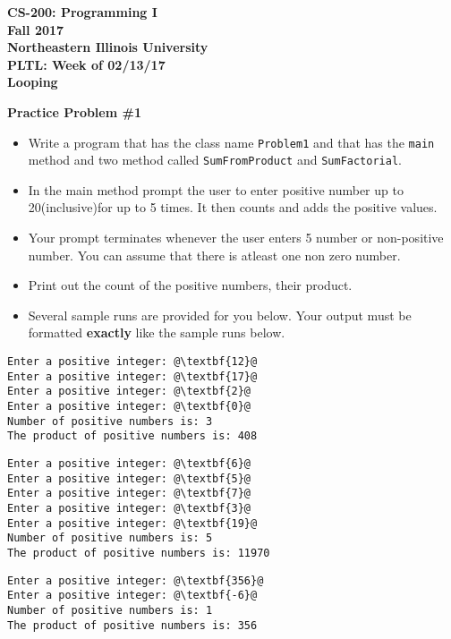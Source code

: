 \documentclass[12pt]{article}
\begin{document}
\begin{center}
	\textbf{CS-200: Programming I}\\
	\textbf{Fall 2017}\\
	\textbf{Northeastern Illinois University}\\
	\textbf{PLTL: Week of 02/13/17}\\
	\textbf{Looping}
\end{center}


\noindent\textbf{Practice Problem \#1}
\begin{itemize}
	\item Write a program that has the class name \texttt{Problem1} and that has the \texttt{main} method and two method called \texttt{SumFromProduct} and \texttt{SumFactorial}.
	\item In the main method prompt the user to enter positive  number up to 20(inclusive)for up to 5 times. It then counts and adds the positive values. 
	\item Your prompt terminates whenever the user enters 5 number or non-positive number. You can assume that there is atleast one non zero number.
	\item Print out the count of the positive numbers, their product.
	\item Several sample runs are provided for you below. Your output must be formatted \textbf{exactly} like the sample runs below.
\end{itemize}
\begin{center}
\begin{minipage}{7cm}
\begin{lstlisting}[escapechar=@]
Enter a positive integer: @\textbf{12}@
Enter a positive integer: @\textbf{17}@
Enter a positive integer: @\textbf{2}@
Enter a positive integer: @\textbf{0}@
Number of positive numbers is: 3
The product of positive numbers is: 408
\end{lstlisting}
\end{minipage}
\hspace*{0.5cm}
\begin{minipage}{7cm}
\begin{lstlisting}[escapechar=@]
Enter a positive integer: @\textbf{6}@
Enter a positive integer: @\textbf{5}@
Enter a positive integer: @\textbf{7}@
Enter a positive integer: @\textbf{3}@
Enter a positive integer: @\textbf{19}@
Number of positive numbers is: 5
The product of positive numbers is: 11970
\end{lstlisting}
\end{minipage}
\begin{minipage}{7cm}
\begin{lstlisting}[escapechar=@]
Enter a positive integer: @\textbf{356}@
Enter a positive integer: @\textbf{-6}@
Number of positive numbers is: 1
The product of positive numbers is: 356
\end{lstlisting}
\end{minipage}
\end{center}
\end{document}
